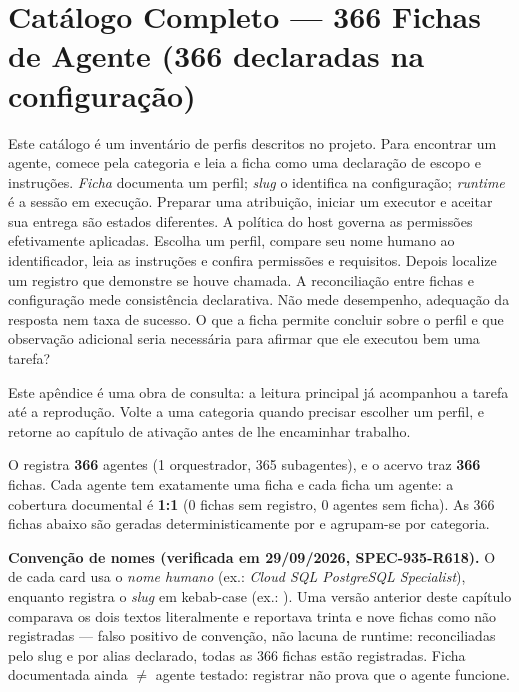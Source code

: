 \chapter{Catálogo Completo — 366 Fichas de Agente (366 declaradas na configuração)}

\roteirodidatico
{Este catálogo é um inventário de perfis descritos no projeto. Para encontrar um agente, comece pela categoria e leia a ficha como uma declaração de escopo e instruções.}
{\emph{Ficha} documenta um perfil; \emph{slug} o identifica na configuração; \emph{runtime} é a sessão em execução. Preparar uma atribuição, iniciar um executor e aceitar sua entrega são estados diferentes. A política do host governa as permissões efetivamente aplicadas.}
{Escolha um perfil, compare seu nome humano ao identificador, leia as instruções e confira permissões e requisitos. Depois localize um registro que demonstre se houve chamada.}
{A reconciliação entre fichas e configuração mede consistência declarativa. Não mede desempenho, adequação da resposta nem taxa de sucesso.}
{O que a ficha permite concluir sobre o perfil e que observação adicional seria necessária para afirmar que ele executou bem uma tarefa?}

Este apêndice é uma obra de consulta: a leitura principal já acompanhou a tarefa até a reprodução. Volte a uma categoria quando precisar escolher um perfil, e retorne ao capítulo de ativação antes de lhe encaminhar trabalho.
\begin{resultado}
O  registra \textbf{366} agentes (1 orquestrador, 365 subagentes), e o acervo  traz \textbf{366} fichas. Cada agente tem exatamente uma ficha e cada ficha um agente: a cobertura documental é \textbf{1:1} (0 fichas sem registro, 0 agentes sem ficha). As 366 fichas abaixo são geradas deterministicamente por  e agrupam-se por categoria.
\end{resultado}

\begin{aviso}
\textbf{Convenção de nomes (verificada em 29/09/2026, SPEC-935-R618).} O  de cada card usa o \emph{nome humano} (ex.: \emph{Cloud SQL PostgreSQL Specialist}), enquanto  registra o \emph{slug} em kebab-case (ex.: ). Uma versão anterior deste capítulo comparava os dois textos literalmente e reportava trinta e nove fichas como não registradas — falso positivo de convenção, não lacuna de runtime: reconciliadas pelo slug e por alias declarado, todas as 366 fichas estão registradas. Ficha documentada ainda $\neq$ agente testado: registrar não prova que o agente funcione.
\end{aviso}

